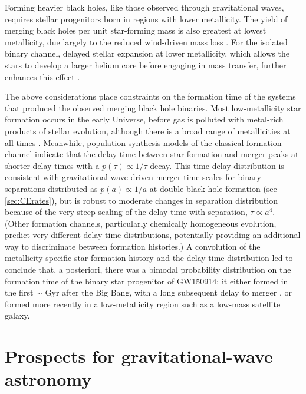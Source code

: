 \documentclass[iop,onecolumn]{revtex4}
\begin{document}
Forming heavier black holes, like those observed through gravitational waves, requires stellar progenitors born in regions with lower metallicity. The yield of merging black holes per unit star-forming mass is also greatest at lowest metallicity, due largely to the reduced wind-driven mass loss \citep[e.g.,][]{Belczynski:2010}. For the isolated binary channel, delayed stellar expansion at lower metallicity, which allows the stars to develop a larger helium core before engaging in mass transfer, further enhances this effect \citep[e.g.,][]{Stevenson:2017}.

The above considerations place constraints on the formation time of the systems that produced the observed merging black hole binaries. Most low-metallicity star formation occurs in the early Universe, before gas is polluted with metal-rich products of stellar evolution, although there is a broad range of metallicities at all times \citep[e.g.,][]{LangerNorman:2006,TaylorKobayashi:2015}. Meanwhile, population synthesis models of the classical formation channel indicate that  the delay time between star formation and merger peaks at shorter delay times with a $p(\tau) \propto 1/\tau$ decay.  This time delay distribution is consistent with gravitational-wave driven merger time scales for binary separations distributed as $p(a) \propto 1/a$ at double black hole formation (see \autoref{sec:CErates}), but  is robust to moderate changes in separation distribution because of the very steep scaling of the delay time with separation, $\tau \propto a^4$.  (Other formation channels, particularly chemically homogeneous evolution, predict very different delay time distributions, potentially providing an additional way to discriminate between formation histories.)  A convolution of the metallicity-specific star formation history and the delay-time distribution led \citet{Belczynski:2016} to conclude that, a posteriori, there was a bimodal probability distribution on the formation time of the binary star progenitor of GW150914: it either formed in the first $\sim$ Gyr after the Big Bang, with a long subsequent delay to merger \citep{Dominik:2014}, or formed more recently in a low-metallicity region such as a low-mass satellite galaxy.  

  

\section{Prospects for gravitational-wave astronomy}\label{prospect}
\end{document}

